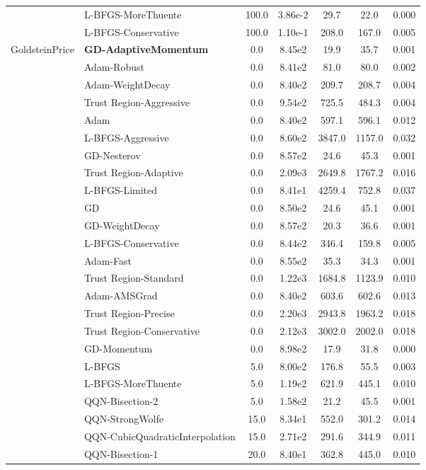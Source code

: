 \documentclass{article}
\begin{document}
\begin{table}[htbp]
{\begin{tabular}{p{2.5cm}p{2.5cm}*{5}{c}}
 & L-BFGS-MoreThuente & 100.0 & 3.86e-2 & 29.7 & 22.0 & 0.000 \\
 & L-BFGS-Conservative & 100.0 & 1.10e-1 & 208.0 & 167.0 & 0.005 \\
\midrule
\multirow{25}{*}{GoldsteinPrice} & \textbf{GD-AdaptiveMomentum} & 0.0 & 8.45e2 & 19.9 & 35.7 & 0.001 \\
 & Adam-Robust & 0.0 & 8.41e2 & 81.0 & 80.0 & 0.002 \\
 & Adam-WeightDecay & 0.0 & 8.40e2 & 209.7 & 208.7 & 0.004 \\
 & Trust Region-Aggressive & 0.0 & 9.54e2 & 725.5 & 484.3 & 0.004 \\
 & Adam & 0.0 & 8.40e2 & 597.1 & 596.1 & 0.012 \\
 & L-BFGS-Aggressive & 0.0 & 8.60e2 & 3847.0 & 1157.0 & 0.032 \\
 & GD-Nesterov & 0.0 & 8.57e2 & 24.6 & 45.3 & 0.001 \\
 & Trust Region-Adaptive & 0.0 & 2.09e3 & 2649.8 & 1767.2 & 0.016 \\
 & L-BFGS-Limited & 0.0 & 8.41e1 & 4259.4 & 752.8 & 0.037 \\
 & GD & 0.0 & 8.50e2 & 24.6 & 45.1 & 0.001 \\
 & GD-WeightDecay & 0.0 & 8.57e2 & 20.3 & 36.6 & 0.001 \\
 & L-BFGS-Conservative & 0.0 & 8.44e2 & 346.4 & 159.8 & 0.005 \\
 & Adam-Fast & 0.0 & 8.55e2 & 35.3 & 34.3 & 0.001 \\
 & Trust Region-Standard & 0.0 & 1.22e3 & 1684.8 & 1123.9 & 0.010 \\
 & Adam-AMSGrad & 0.0 & 8.40e2 & 603.6 & 602.6 & 0.013 \\
 & Trust Region-Precise & 0.0 & 2.20e3 & 2943.8 & 1963.2 & 0.018 \\
 & Trust Region-Conservative & 0.0 & 2.12e3 & 3002.0 & 2002.0 & 0.018 \\
 & GD-Momentum & 0.0 & 8.98e2 & 17.9 & 31.8 & 0.000 \\
 & L-BFGS & 5.0 & 8.00e2 & 176.8 & 55.5 & 0.003 \\
 & L-BFGS-MoreThuente & 5.0 & 1.19e2 & 621.9 & 445.1 & 0.010 \\
 & QQN-Bisection-2 & 5.0 & 1.58e2 & 21.2 & 45.5 & 0.001 \\
 & QQN-StrongWolfe & 15.0 & 8.34e1 & 552.0 & 301.2 & 0.014 \\
 & QQN-CubicQuadraticInterpolation & 15.0 & 2.71e2 & 291.6 & 344.9 & 0.011 \\
 & QQN-Bisection-1 & 20.0 & 8.40e1 & 362.8 & 445.0 & 0.010 \\

\end{tabular}}
\end{table}
\end{document}
